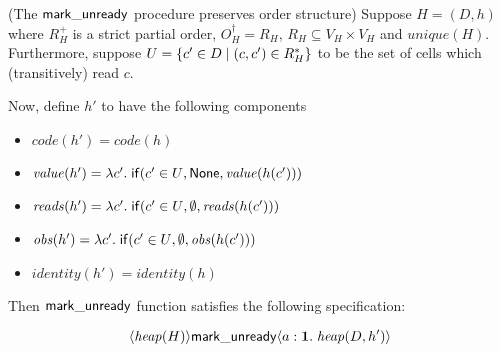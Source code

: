 \begin{lemma}{(The $\mathsf{mark\_unready}$ procedure preserves order structure)}
Suppose $H = (D,h)$ where $R^+_H$ is a strict partial order, $O^\dagger_H = R_H$,
$R_H \subseteq V_H \times V_H$ and $\mathit{unique}(H)$. Furthermore, suppose 
$U = \{{{c' \in D}\;|\;{(c,c') \in R^*_H}}\}$ to be the set of cells which (transitively)
read $c$.

Now, define $h'$ to have the following components
\begin{itemize}
\item $\mathit{code}(h') = \mathit{code}(h)$
\item $\mathit{value}(h') = \lambda c'.\;\mathsf{if}({c'\in U}, {\mathsf{None}}, {\mathit{value}(h(c'))})$
\item $\mathit{reads}(h') = \lambda c'.\;\mathsf{if}({c'\in U}, {\emptyset}, {\mathit{reads}(h(c'))})$
\item $\mathit{obs}(h') = \lambda c'.\;\mathsf{if}({c'\in U}, {\emptyset}, {\mathit{obs}(h(c'))})$
\item $\mathit{identity}(h') = \mathit{identity}(h)$
\end{itemize}

Then $\mathsf{mark\_unready}$ function satisfies the following specification:

\begin{displaymath}
\langle{\mathit{heap}(H)}\rangle{\mathsf{mark\_unready}}\langle{a:\mathbf{1}}.\;{\mathit{heap}(D,h')}\rangle
\end{displaymath}
  
\end{lemma}

